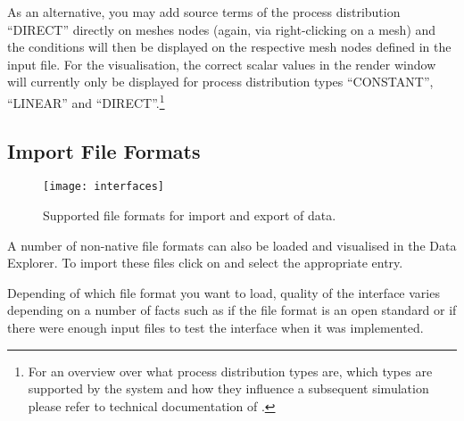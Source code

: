 As an alternative, you may add source terms of the process distribution ``DIRECT'' directly on meshes nodes (again, via right-clicking on a mesh) and the conditions will then be displayed on the respective mesh nodes defined in the input file. For the visualisation, the correct scalar values in the render window will currently only be displayed for process distribution types ``CONSTANT'', ``LINEAR'' and ``DIRECT''.\footnote{For an overview over what process distribution types are, which types are supported by the system and how they influence a subsequent simulation please refer to technical documentation of \ogs.}

\subsection{Import File Formats}

\begin{figure}[tb]
\begin{center}
\texttt{[image: interfaces]}
\caption{Supported file formats for import and export of data.}
\label{fig:interfaces}
\end{center}
\end{figure}

A number of non-native file formats can also be loaded and visualised in the Data Explorer. To import these files click on  and select the appropriate entry.

Depending of which file format you want to load, quality of the interface varies depending on a number of facts such as if the file format is an open standard or if there were enough input files to test the interface when it was implemented.

